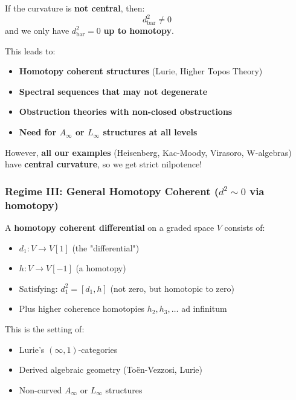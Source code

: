 \begin{remark}\label{rem:non-central-curvature}
If the curvature is \textbf{not central}, then:
\begin{equation}
d_{\text{bar}}^2 \neq 0
\end{equation}
and we only have $d_{\text{bar}}^2 = 0$ \textbf{up to homotopy}.

This leads to:
\begin{itemize}
\item \textbf{Homotopy coherent structures} (Lurie, Higher Topos Theory)
\item \textbf{Spectral sequences that may not degenerate}
\item \textbf{Obstruction theories with non-closed obstructions}
\item \textbf{Need for $A_\infty$ or $L_\infty$ structures at all levels}
\end{itemize}

However, \textbf{all our examples} (Heisenberg, Kac-Moody, Virasoro, W-algebras) have 
\textbf{central curvature}, so we get strict nilpotence!
\end{remark}

\subsubsection{Regime III: General Homotopy Coherent ($d^2 \sim 0$ via homotopy)}

\begin{definition}\label{def:homotopy-coherent}
A \textbf{homotopy coherent differential} on a graded space $V$ consists of:
\begin{itemize}
\item $d_1: V \to V[1]$ (the "differential")
\item $h: V \to V[-1]$ (a homotopy)
\item Satisfying: $d_1^2 = [d_1, h]$ (not zero, but homotopic to zero)
\item Plus higher coherence homotopies $h_2, h_3, \ldots$ ad infinitum
\end{itemize}
\end{definition}

This is the setting of:
\begin{itemize}
\item Lurie's $(\infty, 1)$-categories \cite{LurieHTT}
\item Derived algebraic geometry (To\"en-Vezzosi, Lurie)
\item Non-curved $A_\infty$ or $L_\infty$ structures
\end{itemize}

